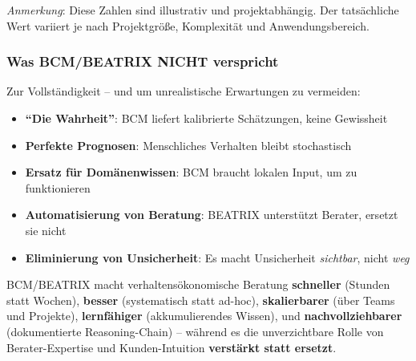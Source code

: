 \textit{Anmerkung}: Diese Zahlen sind illustrativ und projektabhängig. Der tatsächliche Wert variiert je nach Projektgröße, Komplexität und Anwendungsbereich.

\subsubsection{Was BCM/BEATRIX NICHT verspricht}

Zur Vollständigkeit -- und um unrealistische Erwartungen zu vermeiden:

\begin{itemize}
    \item[$\times$] \textbf{``Die Wahrheit''}: BCM liefert kalibrierte Schätzungen, keine Gewissheit
    \item[$\times$] \textbf{Perfekte Prognosen}: Menschliches Verhalten bleibt stochastisch
    \item[$\times$] \textbf{Ersatz für Domänenwissen}: BCM braucht lokalen Input, um zu funktionieren
    \item[$\times$] \textbf{Automatisierung von Beratung}: BEATRIX unterstützt Berater, ersetzt sie nicht
    \item[$\times$] \textbf{Eliminierung von Unsicherheit}: Es macht Unsicherheit \textit{sichtbar}, nicht \textit{weg}
\end{itemize}

\begin{tcolorbox}[colback=blue!5!white, colframe=blue!75!black, title=Das BCM/BEATRIX Value Proposition in einem Satz]
BCM/BEATRIX macht verhaltensökonomische Beratung \textbf{schneller} (Stunden statt Wochen), \textbf{besser} (systematisch statt ad-hoc), \textbf{skalierbarer} (über Teams und Projekte), \textbf{lernfähiger} (akkumulierendes Wissen), und \textbf{nachvollziehbarer} (dokumentierte Reasoning-Chain) -- während es die unverzichtbare Rolle von Berater-Expertise und Kunden-Intuition \textbf{verstärkt statt ersetzt}.
\end{tcolorbox}

